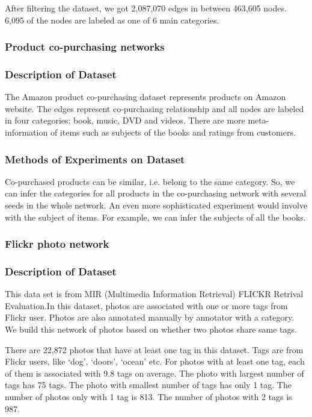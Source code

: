 After filtering the dataset, we got 2,087,070 edges in between 463,605 nodes. 6,095 of the nodes are labeled as one of 6 main categories.



\subsubsection{Product co-purchasing networks}

\subsubsection*{Description of Dataset}
The Amazon product co-purchasing dataset represents products on Amazon website. The edges represent co-purchasing relationship and all nodes are labeled in four categories: book, music, DVD and videos. There are more meta-information of items such as subjects of the books and ratings from customers.

\subsubsection*{Methods of Experiments on Dataset}

Co-purchased products can be similar, i.e. belong to the same category.
So, we can infer the categories for all products in the co-purchasing network with several seeds in the whole network.
An even more sophisticated experiment would involve with the subject of items. For example, we can infer the subjects of all the books.

\subsubsection{Flickr photo network}

\subsubsection*{Description of Dataset}
This data set is from MIR (Multimedia Information Retrieval) FLICKR Retrival Evaluation.In this dataset, photos are associated with one or more tags from Flickr user. Photos are also annotated manually by annotator with a category. We build this network of photos based on whether two photos share same tags. 

There are 22,872 photos that have at least one tag in this dataset. Tags are from Flickr users, like ‘dog’, ‘doors’, ‘ocean’ etc. For photos with at least one tag, each of them is associated with 9.8 tags on average. The photo with largest number of tags has 75 tags. The photo with smallest number of tags has only 1 tag. The number of photos only with 1 tag is 813. The number of photos with 2 tags is 987.

